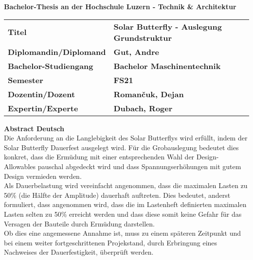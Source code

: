 \vspace{2cm}
\begin{large}
\textbf{Bachelor-Thesis an der Hochschule Luzern - Technik \& Architektur}\\
\end{large}
\vspace{1cm}

\begin{table}[H]
\small
  \begin{tabularx}{\linewidth}{llX}
    \textbf{Titel}                 & \textbf{Solar Butterfly - Auslegung Grundstruktur} &\\[4 mm]
    \textbf{Diplomandin/Diplomand} & \textbf{Gut, Andre}                                &\\[4 mm]
    \textbf{Bachelor-Studiengang}  & \textbf{Bachelor Maschinentechnik}                 &\\[4 mm]
    \textbf{Semester}              & \textbf{FS21}                                      &\\[4 mm]
    \textbf{Dozentin/Dozent}       & \textbf{Roman\v{c}uk, Dejan}                       &\\[4 mm]
    \textbf{Expertin/Experte}      & \textbf{Dubach, Roger}                             &
  \end{tabularx}
\end{table}

\vspace{1.5cm}
\textbf{Abstract Deutsch}\\
Die Anforderung an die Langlebigkeit des Solar Butterflys wird erfüllt, indem der Solar Butterfly Dauerfest ausgelegt wird. Für die Grobauslegung bedeutet dies konkret, dass die Ermüdung mit einer entsprechenden Wahl der Design-Allowables pauschal abgedeckt wird und dass Spannungserhöhungen mit gutem Design vermieden werden.\\
Als Dauerbelastung wird vereinfacht angenommen, dass die maximalen Lasten zu 50\% (die Hälfte der Amplitude) dauerhaft auftreten. Dies bedeutet, anderst formuliert, dass angenommen wird, dass die im Lastenheft definierten maximalen Lasten selten zu 50\% erreicht werden und dass diese somit keine Gefahr für das Versagen der Bauteile durch Ermüdung darstellen.\\
Ob dies eine angemessene Annahme ist, muss zu einem späteren Zeitpunkt und bei einem weiter fortgeschrittenen Projekstand, durch Erbringung eines Nachweises der Dauerfestigkeit, überprüft werden.\\

